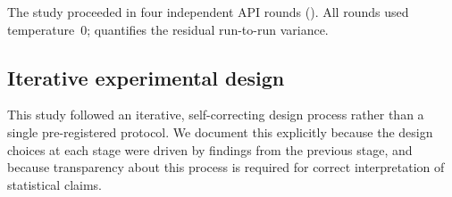 \documentclass[11pt,a4paper]{article}
\begin{document}
The study proceeded in four independent API rounds ().
All rounds used temperature~0;  quantifies the
residual run-to-run variance.

\begin{table}[htbp]
\centering
\caption{Experimental rounds.  R1, R2, EXP, and R3 are separate API runs.
  Temperature-0 non-determinism produces 1--2 error differences across
  runs (verified; ).  Numbers across datasets
  may not be combined.
  [\emph{Source: findings-structured.md, data collection section}]}
\label{tab:rounds}
\smallskip
\small
{}%
\end{table}

\subsection{Iterative experimental design}
\label{sec:benchmark:iterative}

This study followed an iterative, self-correcting design process rather than
a single pre-registered protocol.  We document this explicitly because the
design choices at each stage were driven by findings from the previous stage,
and because transparency about this process is required for correct
interpretation of statistical claims.
\end{document}
